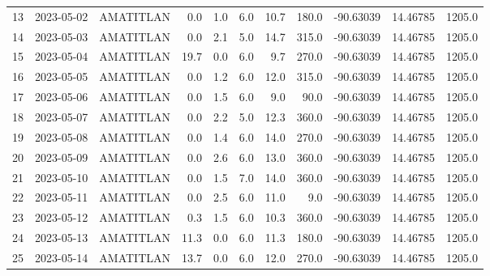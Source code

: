 \documentclass[12pt]{article}
\begin{document}
\begin{center}
\begin{tabular}{lllrrrrrrrr}
13  & 2023-05-02 &  AMATITLAN &     0.0 &      1.0 &  6.0 &        10.7 &       180.0 & -90.63039 &  14.46785 &   1205.0 \\
14  & 2023-05-03 &  AMATITLAN &     0.0 &      2.1 &  5.0 &        14.7 &       315.0 & -90.63039 &  14.46785 &   1205.0 \\
15  & 2023-05-04 &  AMATITLAN &    19.7 &      0.0 &  6.0 &         9.7 &       270.0 & -90.63039 &  14.46785 &   1205.0 \\
16  & 2023-05-05 &  AMATITLAN &     0.0 &      1.2 &  6.0 &        12.0 &       315.0 & -90.63039 &  14.46785 &   1205.0 \\
17  & 2023-05-06 &  AMATITLAN &     0.0 &      1.5 &  6.0 &         9.0 &        90.0 & -90.63039 &  14.46785 &   1205.0 \\
18  & 2023-05-07 &  AMATITLAN &     0.0 &      2.2 &  5.0 &        12.3 &       360.0 & -90.63039 &  14.46785 &   1205.0 \\
19  & 2023-05-08 &  AMATITLAN &     0.0 &      1.4 &  6.0 &        14.0 &       270.0 & -90.63039 &  14.46785 &   1205.0 \\
20  & 2023-05-09 &  AMATITLAN &     0.0 &      2.6 &  6.0 &        13.0 &       360.0 & -90.63039 &  14.46785 &   1205.0 \\
21  & 2023-05-10 &  AMATITLAN &     0.0 &      1.5 &  7.0 &        14.0 &       360.0 & -90.63039 &  14.46785 &   1205.0 \\
22  & 2023-05-11 &  AMATITLAN &     0.0 &      2.5 &  6.0 &        11.0 &         9.0 & -90.63039 &  14.46785 &   1205.0 \\
23  & 2023-05-12 &  AMATITLAN &     0.3 &      1.5 &  6.0 &        10.3 &       360.0 & -90.63039 &  14.46785 &   1205.0 \\
24  & 2023-05-13 &  AMATITLAN &    11.3 &      0.0 &  6.0 &        11.3 &       180.0 & -90.63039 &  14.46785 &   1205.0 \\
25  & 2023-05-14 &  AMATITLAN &    13.7 &      0.0 &  6.0 &        12.0 &       270.0 & -90.63039 &  14.46785 &   1205.0 \\
\bottomrule
\end{tabular}

        
        \end{center}
        
\end{document}
